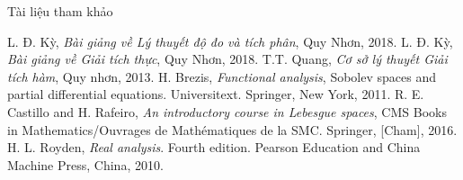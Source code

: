 \documentclass[notheorems,envcountsect,hyperref=unicode]{beamer}
\begin{document}
\begin{frame}{Tài liệu tham khảo}
\begin{thebibliography}{99}
	 L. Đ. Kỳ, \textit{Bài giảng về Lý thuyết độ đo và tích phân}, Quy Nhơn, 2018.
	 L. Đ. Kỳ, \textit{Bài giảng về Giải tích thực}, Quy Nhơn, 2018.
	 T.T. Quang, \textit{Cơ sở lý thuyết Giải tích hàm}, Quy nhơn, 2013.
	 H. Brezis, \textit{Functional analysis}, Sobolev spaces and partial differential equations. Universitext. Springer, New York, 2011.
	 R. E. Castillo and H. Rafeiro, \textit{An introductory course in Lebesgue spaces}, CMS Books in Mathematics/Ouvrages de Mathématiques de la SMC. Springer, [Cham], 2016.
	 H. L. Royden, \textit{Real analysis}. Fourth edition. Pearson Education and China Machine Press, China, 2010.
\end{thebibliography}
\end{frame}
\begin{frame}
\centerline{\Large\bf \fontsize{18}{18}\selectfont{\color{red}{KẾT THÚC BÁO CÁO}}}
\vspace{1cm}
\centerline{\Large\bf \fontsize{23}{18}\selectfont{\color{blue}{TRÂN TRỌNG CẢM ƠN!}}}

\end{frame}
\end{document}
